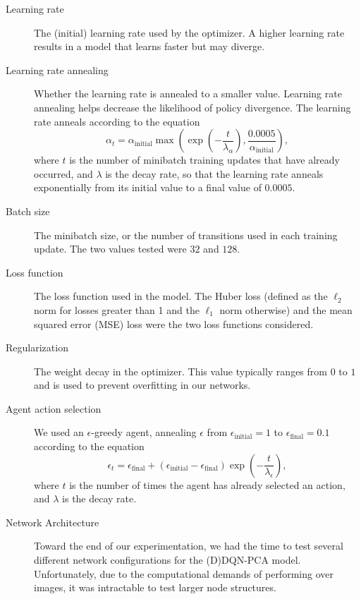 \documentclass[11pt]{article}
\begin{document}
\begin{description}
    \item[Learning rate] The (initial) learning rate used by the optimizer. A higher learning rate results in a model that learns faster but may diverge.
    
    \item[Learning rate annealing] Whether the learning rate is annealed to a smaller value. Learning rate annealing helps decrease the likelihood of policy divergence. The learning rate anneals according to the equation $$\alpha_t = \alpha_\text{initial} \max\left(\exp\left(-\frac{t}{\lambda_\alpha}\right), \frac{0.0005}{\alpha_\text{initial}}\right),$$ where $t$ is the number of minibatch training updates that have already occurred, and $\lambda$ is the decay rate, so that the learning rate anneals exponentially from its initial value to a final value of $0.0005$.
    
    \item[Batch size] The minibatch size, or the number of transitions used in each training update. The two values tested were $32$ and $128$.
    
    \item[Loss function] The loss function used in the model. The Huber loss (defined as the $\ell_2$ norm for losses greater than 1 and the $\ell_1$ norm otherwise) and the mean squared error (MSE) loss were the two loss functions considered.
    
    \item[Regularization] The weight decay in the optimizer. This value typically ranges from $0$ to $1$ and is used to prevent overfitting in our networks.
    
    \item[Agent action selection] We used an $\epsilon$-greedy agent, annealing $\epsilon$ from $\epsilon_\text{initial} = 1$ to $\epsilon_\text{final} = 0.1$ according to the equation $$\epsilon_t = \epsilon_\text{final} + (\epsilon_\text{initial} - \epsilon_\text{final}) \exp\left(-\frac{t}{\lambda_\epsilon}\right),$$ where $t$ is the number of times the agent has already selected an action, and $\lambda$ is the decay rate. 
    
    \item[Network Architecture] Toward the end of our experimentation, we had the time to test several different network configurations for the (D)DQN-PCA model. Unfortunately, due to the computational demands of performing over images, it was intractable to test larger node structures.
\end{description}
\end{document}
